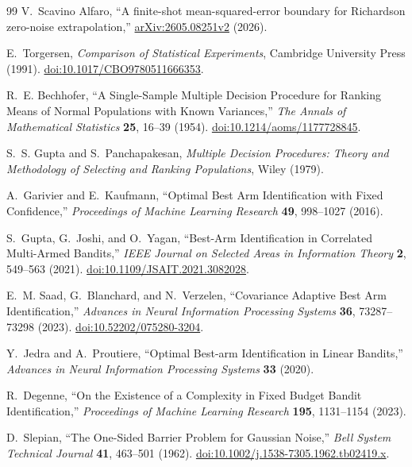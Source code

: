 \documentclass[a4paper,onecolumn,unpublished,nopdfoutputerror]{quantumarticle}
\theoremstyle{plain}
\theoremstyle{definition}
\newcommand{\1}{\mathbf{1}}
\begin{document}
\begin{thebibliography}{99}
V.~Scavino Alfaro,
``A finite-shot mean-squared-error boundary for Richardson zero-noise extrapolation,''
\href{https://arxiv.org/abs/2605.08251v2}{arXiv:2605.08251v2} (2026).

E.~Torgersen,
\emph{Comparison of Statistical Experiments},
Cambridge University Press (1991). \href{https://doi.org/10.1017/CBO9780511666353}{doi:10.1017/CBO9780511666353}.

R.~E. Bechhofer,
``A Single-Sample Multiple Decision Procedure for Ranking Means of Normal Populations with Known Variances,''
\emph{The Annals of Mathematical Statistics} \textbf{25}, 16--39 (1954). \href{https://doi.org/10.1214/aoms/1177728845}{doi:10.1214/aoms/1177728845}.

S.~S. Gupta and S.~Panchapakesan,
\emph{Multiple Decision Procedures: Theory and Methodology of Selecting and Ranking Populations},
Wiley (1979).

A.~Garivier and E.~Kaufmann,
``Optimal Best Arm Identification with Fixed Confidence,''
\emph{Proceedings of Machine Learning Research} \textbf{49}, 998--1027 (2016).

S.~Gupta, G.~Joshi, and O.~Yagan,
``Best-Arm Identification in Correlated Multi-Armed Bandits,''
\emph{IEEE Journal on Selected Areas in Information Theory} \textbf{2}, 549--563 (2021). \href{https://doi.org/10.1109/JSAIT.2021.3082028}{doi:10.1109/JSAIT.2021.3082028}.

E.~M. Saad, G.~Blanchard, and N.~Verzelen,
``Covariance Adaptive Best Arm Identification,''
\emph{Advances in Neural Information Processing Systems} \textbf{36}, 73287--73298 (2023). \href{https://doi.org/10.52202/075280-3204}{doi:10.52202/075280-3204}.

Y.~Jedra and A.~Proutiere,
``Optimal Best-arm Identification in Linear Bandits,''
\emph{Advances in Neural Information Processing Systems} \textbf{33} (2020).

R.~Degenne,
``On the Existence of a Complexity in Fixed Budget Bandit Identification,''
\emph{Proceedings of Machine Learning Research} \textbf{195}, 1131--1154 (2023).

D.~Slepian,
``The One-Sided Barrier Problem for Gaussian Noise,''
\emph{Bell System Technical Journal} \textbf{41}, 463--501 (1962). \href{https://doi.org/10.1002/j.1538-7305.1962.tb02419.x}{doi:10.1002/j.1538-7305.1962.tb02419.x}.


\end{thebibliography}
\end{document}
